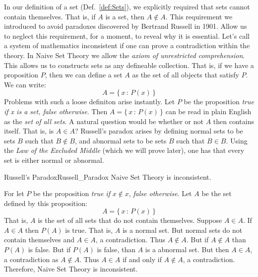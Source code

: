         In our definition of a set (Def.~\ref{def:Sets}), we explicitly
        required that sets cannot contain themselves. That is, if
        $A$ is a set, then $A\notin{A}$. This requirement we introduced to
        avoid paradoxes discovered by Bertrand Russell in 1901. Allow us to
        neglect this requirement, for a moment, to reveal why it is essential.
        Let's call a system of mathematics inconsistent if one can prove
        a contradiction within the theory. In Naive Set Theory we allow the
        \textit{axiom of unrestricted comprehension}. This allows us to
        constructs sets as any defineable collection. That is, if we have a
        proposition $P$, then we can define a set $A$ as the set of all objects
        that satisfy $P$. We can write:
        \begin{equation}
            A=\{\,x\,:\,P(x)\,\}
        \end{equation}
        Problems with such a loose definiton arise instantly. Let $P$ be the
        proposition \textit{true if x is a set, false otherwise}. Then
        $A=\{\,x\,:\,P(x)\,\}$ can be read in plain English as the
        \textit{set of all sets}. A natural question would be whether or not
        $A$ then contains itself. That is, is $A\in{A}$? Russell's paradox
        arises by defining normal sets to be sets $B$ such that $B\notin{B}$,
        and abnormal sets to be sets $B$ such that $B\in{B}$. Using the
        \textit{Law of the Excluded Middle} (which we will prove later), one
        has that every set is either normal or abnormal.
        \begin{ftheorem}{Russell's Paradox}{Russell_Paradox}
            Naive Set Theory is inconsistent.
        \end{ftheorem}
        \begin{bproof}
            For let $P$ be the proposition
            \textit{true if} $x\notin{x}$, \textit{false otherwise}.
            Let $A$ be the set defined by this proposition:
            \begin{equation}
                A=\{\,x\,:\,P(x)\,\}
            \end{equation}
            That is, $A$ is the set of all sets that do not contain themselves.
            Suppose $A\in{A}$. If $A\in{A}$ then $P(A)$ is true. That is,
            $A$ is a normal set. But normal sets do not contain themselves and
            $A\in{A}$, a contradiction. Thus $A\notin{A}$. But if
            $A\notin{A}$ than $P(A)$ is false. But if $P(A)$ is false, than
            $A$ is a abnormal set. But then $A\in{A}$, a contradiction as
            $A\notin{A}$. Thus $A\in{A}$ if and only if $A\notin{A}$, a
            contradiction. Therefore, Naive Set Theory is inconsistent.
        \end{bproof}
